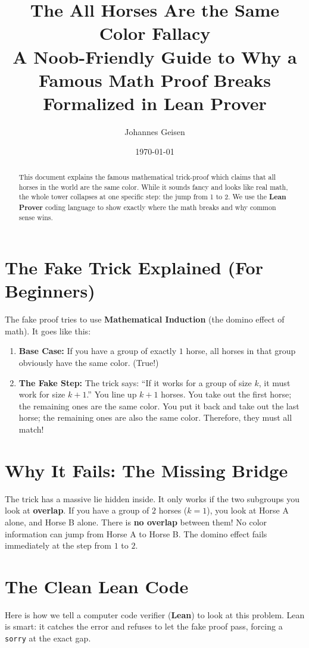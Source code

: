 \documentclass[a4paper,12pt]{article}
\title{The All Horses Are the Same Color Fallacy\\
\large A Noob-Friendly Guide to Why a Famous Math Proof Breaks\\Formalized in Lean Prover}
\author{Johannes Geisen}
\date{\today}
\begin{document}
\maketitle

\begin{abstract}
This document explains the famous mathematical trick-proof which claims that all horses in the world are the same color. While it sounds fancy and looks like real math, the whole tower collapses at one specific step: the jump from 1 to 2. We use the \textbf{Lean Prover} coding language to show exactly where the math breaks and why common sense wins.
\end{abstract}

\section{The Fake Trick Explained (For Beginners)}
The fake proof tries to use \textbf{Mathematical Induction} (the domino effect of math). It goes like this:
\begin{enumerate}
    \item \textbf{Base Case:} If you have a group of exactly $1$ horse, all horses in that group obviously have the same color. (True!)
    \item \textbf{The Fake Step:} The trick says: ``If it works for a group of size $k$, it must work for size $k+1$.'' You line up $k+1$ horses. You take out the first horse; the remaining ones are the same color. You put it back and take out the last horse; the remaining ones are also the same color. Therefore, they must all match!
\end{enumerate}

\section{Why It Fails: The Missing Bridge}
The trick has a massive lie hidden inside. It only works if the two subgroups you look at \textbf{overlap}. 
If you have a group of $2$ horses ($k=1$), you look at Horse A alone, and Horse B alone. There is \textbf{no overlap} between them! No color information can jump from Horse A to Horse B. The domino effect fails immediately at the step from $1$ to $2$.

\section{The Clean Lean Code}
Here is how we tell a computer code verifier (\textbf{Lean}) to look at this problem. Lean is smart: it catches the error and refuses to let the fake proof pass, forcing a \texttt{sorry} at the exact gap.
\end{document}
